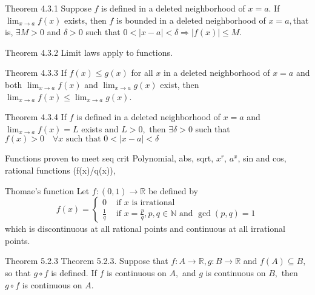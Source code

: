 \documentclass[10pt,landscape]{article}
\theoremstyle{definition}
\newcommand{\thistheoremname}{}
\newtheorem*{genericthm*}{\thistheoremname}
\newenvironment{namedthm*}[1]
{\renewcommand{\thistheoremname}{#1}\begin{genericthm*}}
{\end{genericthm*}}
\begin{document}
\begin{multicols}{3}
	\begin{namedthm*}{Theorem 4.3.1}
		Suppose \(f\) is defined in a deleted neighborhood of \(x=a\). If \(\lim _{x \rightarrow a} f(x)\) exists, then \(f\) is
		bounded in a deleted neighborhood of \(x=a,\)that is, \(\exists M>0\) and \(\delta>0\) such that \(0<|x-a|<\delta \Longrightarrow|f(x)| \leq M\).
	\end{namedthm*}

	\begin{namedthm*}{Theorem 4.3.2}
		Limit laws apply to functions.
	\end{namedthm*}

	\begin{namedthm*}{Theorem 4.3.3}
		If \(f(x) \leq g(x)\) for all \(x\) in a deleted neighborhood of \(x=a\) and both \(\lim _{x \rightarrow a} f(x)\) and
		\(\lim _{x \rightarrow a} g(x)\) exist, then \(\lim _{x \rightarrow a} f(x) \leq \lim _{x \rightarrow a} g(x)\).
	\end{namedthm*}

	\begin{namedthm*}{Theorem 4.3.4}
		If \(f\) is defined in a deleted neighborhood of \(x=a\) and \(\lim _{x \rightarrow a} f(x)=L\) exists and \(L>0,\)
		then \(\exists \delta>0\) such that
		\(
		f(x)>0 \quad \forall x \text { such that } 0<|x-a|<\delta
		\)
	\end{namedthm*}

	\begin{namedthm*}{Functions proven to meet seq crit}
		Polynomial, abs, sqrt, \(x^r\),  \(a^x\), sin and cos, rational functions (f(x)/q(x)),
	\end{namedthm*}

	\begin{namedthm*}{Thomae's function}
		Let \(f:(0,1) \rightarrow \mathbb{R}\) be defined by
		\[
			f(x)=\left\{\begin{array}{ll}{0} & {\text { if } x \text { is irrational }} \\ {\frac{1}{q}} & {\text { if } x=\frac{p}{q}, p, q \in \mathbb{N} \text { and } \operatorname{gcd}(p, q)=1}\end{array}\right.
		\]
		which is discontinuous at all rational points and continuous at all irrational points.
	\end{namedthm*}

	\begin{namedthm*}{Theorem 5.2.3}
		Theorem 5.2.3. Suppose that \(f: A \rightarrow \mathbb{R}, g: B \rightarrow \mathbb{R}\) and \(f(A) \subseteq B,\) so that \(g \circ f\) is defined. If \(f\) is
		continuous on \(A,\) and \(g\) is continuous on \(B,\) then \(g \circ f\) is continuous on \(A .\)
	\end{namedthm*}


\end{multicols}
\end{document}
